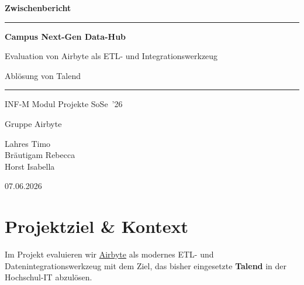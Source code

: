 \documentclass[a4paper,12pt]{article}
\newcommand{\reportdate}{07.06.2026}
\begin{document}
 
\begin{titlepage}
    \centering
    \vspace*{3.5cm}
    {\LARGE\bfseries Zwischenbericht\par}
    \vspace{1.2em}
    {\color{hsoBlue}\rule{\linewidth}{1.5pt}}\par
    \vspace{1em}
    {\Large\bfseries Campus Next-Gen Data-Hub\par}
    \vspace{0.6em}
    {\large Evaluation von Airbyte als ETL- und Integrationswerkzeug\par}
    \vspace{0.4em}
    {\large Ablösung von Talend\par}
    \vspace{1em}
    {\color{hsoBlue}\rule{\linewidth}{0.5pt}}\par
    \vspace{3em}
    {\large INF-M Modul Projekte SoSe~'26\par}
    \vspace{0.5em}
    {\large Gruppe Airbyte\par}
    \vspace{2.5em}
    {\large
        Lahres Timo\\[0.5em]
        Bräutigam Rebecca\\[0.5em]
        Horst Isabella
    \par}
    \vspace{3em}
    {\large \reportdate\par}
    \vfill
\end{titlepage}
 
\thispagestyle{empty}
\tableofcontents
\clearpage
 
\section{Projektziel \& Kontext}
 
Im Projekt evaluieren wir \href{https://airbyte.com/}{Airbyte} als modernes ETL- und
Datenintegrationswerkzeug mit dem Ziel, das bisher eingesetzte \textbf{Talend} in der
Hochschul-IT abzulösen.
 
\end{document}
